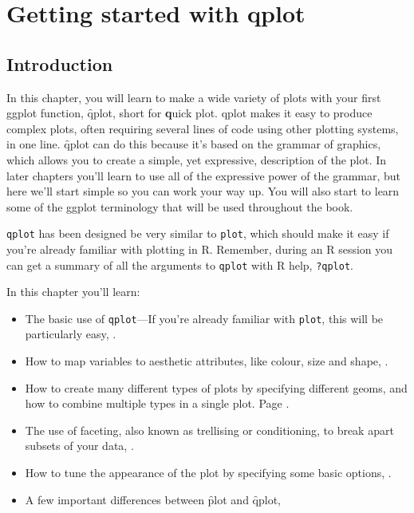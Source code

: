 

% 

% 


\chapter{Getting started with qplot}
\label{cha:qplot}

\section{Introduction} 

In this chapter, you will learn to make a wide variety of plots with your first ggplot function, \f{qplot}, short for {\bf q}uick plot. qplot makes it easy to produce complex plots, often requiring several lines of code using other plotting systems, in one line. \f{qplot} can do this because it's based on the grammar of graphics, which allows you to create a simple, yet expressive, description of the plot.  In later chapters you'll learn to use all of the expressive power of the grammar, but here we'll start simple so you can work your way up.  You will also start to learn some of the ggplot terminology that will be used throughout the book.

{\tt qplot} has been designed be very similar to {\tt plot}, which should make it easy if you're already familiar with plotting in R.  Remember, during an R session you can get a summary of all the arguments to {\tt qplot} with R help, {\tt ?qplot}.

In this chapter you'll learn:

\begin{itemize}
  \item The basic use of {\tt qplot}---If you're already familiar with {\tt plot}, this will be particularly easy, .
  \item How to map variables to aesthetic attributes, like colour, size and shape, .
  \item How to create many different types of plots by specifying different geoms, and how to combine multiple types in a single plot. Page .
  \item The use of faceting, also known as trellising or conditioning, to break apart subsets of your data, .
  \item How to tune the appearance of the plot by specifying some basic options, .
  \item A few important differences between \f{plot} and \f{qplot}, 
\end{itemize}

